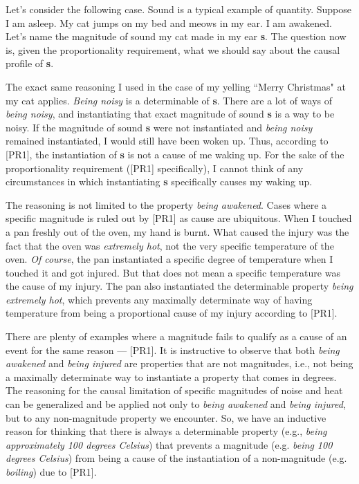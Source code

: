 \documentclass[a4paper,12pt]{article}
\begin{document}
Let's consider the following case. Sound is a typical example of quantity. Suppose I am asleep. My cat jumps on my bed and meows in my ear. I am awakened. Let's name the magnitude of sound my cat made in my ear \textbf{s}. The question now is, given the proportionality requirement, what we should say about the causal profile of \textbf{s}.

The exact same reasoning I used in the case of my yelling ``Merry Christmas" at my cat applies. \emph{Being noisy} is a determinable of \textbf{s}. There are a lot of ways of \emph{being noisy}, and instantiating that exact magnitude of sound \textbf{s} is a way to be noisy. If the magnitude of sound \textbf{s} were not instantiated and \emph{being noisy} remained instantiated, I would still have been woken up. Thus, according to [PR1], the instantiation of \textbf{s} is not a cause of me waking up. For the sake of the proportionality requirement ([PR1] specifically), I cannot think of any circumstances in which instantiating \textbf{s} specifically causes my waking up.

The reasoning is not limited to the property \emph{being awakened}. Cases where a specific magnitude is ruled out by [PR1] as cause are ubiquitous. When I touched a pan freshly out of the oven, my hand is burnt. What caused the injury was the fact that the oven was \emph{extremely hot}, not the very specific temperature of the oven. \emph{Of course}, the pan instantiated a specific degree of temperature when I touched it and got injured. But that does not mean a specific temperature was the cause of my injury. The pan also instantiated the determinable property \emph{being extremely hot}, which prevents any maximally determinate way of having temperature from being a proportional cause of my injury according to [PR1].

There are plenty of examples where a magnitude fails to qualify as a cause of an event for the same reason --- [PR1]. It is instructive to observe that both \emph{being awakened} and \emph{being injured} are properties that are not magnitudes, i.e., not being a maximally determinate way to instantiate a property that comes in degrees. The reasoning for the causal limitation of specific magnitudes of noise and heat can be generalized and be applied not only to \emph{being awakened} and \emph{being injured}, but to any non-magnitude property we encounter. So, we have an inductive reason for thinking that there is always a determinable property (e.g., \emph{being approximately 100 degrees Celsius}) that prevents a magnitude (e.g. \emph{being 100 degrees Celsius}) from being a cause of the instantiation of a non-magnitude (e.g. \emph{boiling}) due to [PR1].
\end{document}
